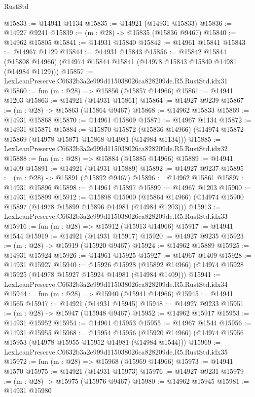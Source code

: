 \begin{lexlean}{RustStd}
\begin{coremodule}
@15833 := @14941 @1134
@15835 := @14921 (@14931 @15833)
@15836 := @14927 @9241
@15839 := (m : @28) -> @15835 (@15836 @9467)
@15840 := @14962 @15805
@15841 := @14931 @15840
@15842 := @14961 @15841
@15843 := @14967 @1129
@15844 := @14931 @15843
@15856 := @15842
    @15844
    (@15808 @14966)
    (@14974 @15844 @15841 (@14978 @15843 @15840 @14981 (@14984 @1129)))
@15857 := LexLeanPreserve.C6632b3a2e999d115038026ca828209de.R5.RustStd.idx31
@15860 := fun (m : @28) => @15856 (@15857 @14966)
@15861 := @14941 @1203
@15863 := @14921 (@14931 @15861)
@15864 := @14927 @9239
@15867 := (m : @28) -> @15863 (@15864 @9467)
@15868 := @14962 @15833
@15869 := @14931 @15868
@15870 := @14961 @15869
@15871 := @14967 @1134
@15872 := @14931 @15871
@15884 := @15870
    @15872
    (@15836 @14966)
    (@14974 @15872 @15869 (@14978 @15871 @15868 @14981 (@14984 @1134)))
@15885 := LexLeanPreserve.C6632b3a2e999d115038026ca828209de.R5.RustStd.idx32
@15888 := fun (m : @28) => @15884 (@15885 @14966)
@15889 := @14941 @1409
@15891 := @14921 (@14931 @15889)
@15892 := @14927 @9237
@15895 := (m : @28) -> @15891 (@15892 @9467)
@15896 := @14962 @15861
@15897 := @14931 @15896
@15898 := @14961 @15897
@15899 := @14967 @1203
@15900 := @14931 @15899
@15912 := @15898
    @15900
    (@15864 @14966)
    (@14974 @15900 @15897 (@14978 @15899 @15896 @14981 (@14984 @1203)))
@15913 := LexLeanPreserve.C6632b3a2e999d115038026ca828209de.R5.RustStd.idx33
@15916 := fun (m : @28) => @15912 (@15913 @14966)
@15917 := @14941 @1544
@15919 := @14921 (@14931 @15917)
@15920 := @14927 @9235
@15923 := (m : @28) -> @15919 (@15920 @9467)
@15924 := @14962 @15889
@15925 := @14931 @15924
@15926 := @14961 @15925
@15927 := @14967 @1409
@15928 := @14931 @15927
@15940 := @15926
    @15928
    (@15892 @14966)
    (@14974 @15928 @15925 (@14978 @15927 @15924 @14981 (@14984 @1409)))
@15941 := LexLeanPreserve.C6632b3a2e999d115038026ca828209de.R5.RustStd.idx34
@15944 := fun (m : @28) => @15940 (@15941 @14966)
@15945 := @14941 @1565
@15947 := @14921 (@14931 @15945)
@15948 := @14927 @9233
@15951 := (m : @28) -> @15947 (@15948 @9467)
@15952 := @14962 @15917
@15953 := @14931 @15952
@15954 := @14961 @15953
@15955 := @14967 @1544
@15956 := @14931 @15955
@15968 := @15954
    @15956
    (@15920 @14966)
    (@14974 @15956 @15953 (@14978 @15955 @15952 @14981 (@14984 @1544)))
@15969 := LexLeanPreserve.C6632b3a2e999d115038026ca828209de.R5.RustStd.idx35
@15972 := fun (m : @28) => @15968 (@15969 @14966)
@15973 := @14941 @1570
@15975 := @14921 (@14931 @15973)
@15976 := @14927 @9231
@15979 := (m : @28) -> @15975 (@15976 @9467)
@15980 := @14962 @15945
@15981 := @14931 @15980

\end{coremodule}
\end{lexlean}
